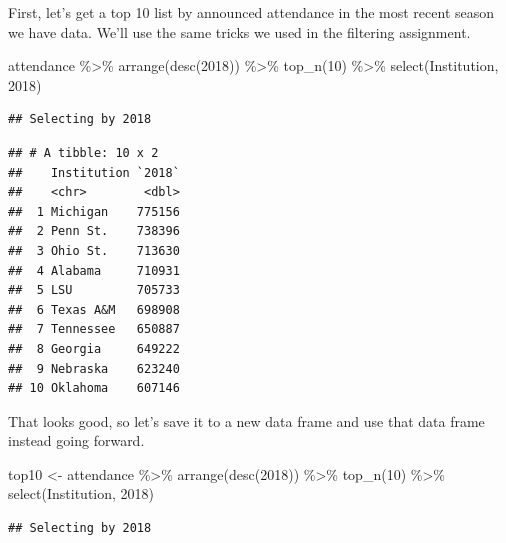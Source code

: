 \documentclass[
]{book}
\newenvironment{Shaded}{\begin{snugshade}}{\end{snugshade}}
\newcommand{\AttributeTok}[1]{\textcolor[rgb]{0.77,0.63,0.00}{#1}}
\newcommand{\DecValTok}[1]{\textcolor[rgb]{0.00,0.00,0.81}{#1}}
\newcommand{\FunctionTok}[1]{\textcolor[rgb]{0.00,0.00,0.00}{#1}}
\newcommand{\NormalTok}[1]{#1}
\newcommand{\OtherTok}[1]{\textcolor[rgb]{0.56,0.35,0.01}{#1}}
\newcommand{\SpecialCharTok}[1]{\textcolor[rgb]{0.00,0.00,0.00}{#1}}
\newcommand{\StringTok}[1]{\textcolor[rgb]{0.31,0.60,0.02}{#1}}
\begin{document}
First, let's get a top 10 list by announced attendance in the most recent season we have data. We'll use the same tricks we used in the filtering assignment.

\begin{Shaded}
\begin{Highlighting}[]
\NormalTok{attendance }\SpecialCharTok{\%\textgreater{}\%} 
  \FunctionTok{arrange}\NormalTok{(}\FunctionTok{desc}\NormalTok{(}\StringTok{\textasciigrave{}}\AttributeTok{2018}\StringTok{\textasciigrave{}}\NormalTok{)) }\SpecialCharTok{\%\textgreater{}\%} 
  \FunctionTok{top\_n}\NormalTok{(}\DecValTok{10}\NormalTok{) }\SpecialCharTok{\%\textgreater{}\%} 
  \FunctionTok{select}\NormalTok{(Institution, }\StringTok{\textasciigrave{}}\AttributeTok{2018}\StringTok{\textasciigrave{}}\NormalTok{)}
\end{Highlighting}
\end{Shaded}

\begin{verbatim}
## Selecting by 2018
\end{verbatim}

\begin{verbatim}
## # A tibble: 10 x 2
##    Institution `2018`
##    <chr>        <dbl>
##  1 Michigan    775156
##  2 Penn St.    738396
##  3 Ohio St.    713630
##  4 Alabama     710931
##  5 LSU         705733
##  6 Texas A&M   698908
##  7 Tennessee   650887
##  8 Georgia     649222
##  9 Nebraska    623240
## 10 Oklahoma    607146
\end{verbatim}

That looks good, so let's save it to a new data frame and use that data frame instead going forward.

\begin{Shaded}
\begin{Highlighting}[]
\NormalTok{top10 }\OtherTok{\textless{}{-}}\NormalTok{ attendance }\SpecialCharTok{\%\textgreater{}\%}
  \FunctionTok{arrange}\NormalTok{(}\FunctionTok{desc}\NormalTok{(}\StringTok{\textasciigrave{}}\AttributeTok{2018}\StringTok{\textasciigrave{}}\NormalTok{)) }\SpecialCharTok{\%\textgreater{}\%} 
  \FunctionTok{top\_n}\NormalTok{(}\DecValTok{10}\NormalTok{) }\SpecialCharTok{\%\textgreater{}\%} 
  \FunctionTok{select}\NormalTok{(Institution, }\StringTok{\textasciigrave{}}\AttributeTok{2018}\StringTok{\textasciigrave{}}\NormalTok{)}
\end{Highlighting}
\end{Shaded}

\begin{verbatim}
## Selecting by 2018
\end{verbatim}
\end{document}
